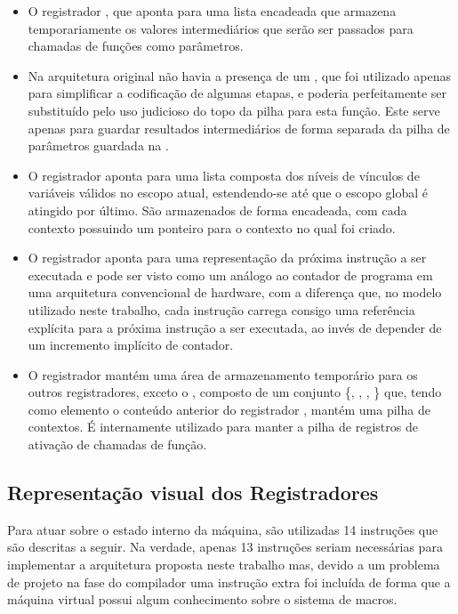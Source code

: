 \begin{itemize}

\item O registrador , que aponta para uma lista encadeada que
armazena temporariamente os valores intermediários que serão ser passados para
chamadas de funções como parâmetros. 

\item Na arquitetura original não havia a presença de um , que
foi utilizado apenas para simplificar a codificação de algumas etapas, e
poderia perfeitamente ser substituído pelo uso judicioso do topo da pilha para
esta função. Este serve apenas para guardar resultados intermediários de forma
separada da pilha de parâmetros guardada na . 

\item O registrador  aponta para uma lista composta dos
níveis de vínculos de variáveis válidos no escopo atual, estendendo-se até que
o escopo global é atingido por último. São armazenados de forma encadeada, com
cada contexto possuindo um ponteiro para o contexto no qual foi criado.

\item O registrador  aponta para uma representação da próxima
instrução a ser executada e pode ser visto como um análogo ao contador de
programa em uma arquitetura convencional de hardware, com a diferença que, no
modelo utilizado neste trabalho, cada instrução carrega consigo uma referência
explícita para a próxima instrução a ser executada, ao invés de depender de um
incremento implícito de contador.

\item O registrador  mantém uma área de armazenamento temporário
para os outros registradores, exceto o , composto de um
conjunto \{, , , \} que, tendo como elemento o
conteúdo anterior do registrador , mantém uma pilha de contextos. É
internamente utilizado para manter a pilha de registros de ativação de chamadas
de função. 

\end{itemize}


\subsection{Representação visual dos Registradores}
\label{ss:registradores-visual}

Para atuar sobre o estado interno da máquina, são utilizadas 14 instruções que são
descritas a seguir. Na verdade, apenas 13 instruções seriam necessárias para
implementar a arquitetura proposta neste trabalho mas, devido a um problema de
projeto na fase do compilador uma instrução extra foi incluída de forma que a
máquina virtual possui algum conhecimento sobre o sistema de macros.

